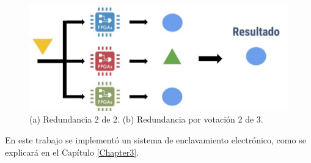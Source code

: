 			\begin{figure}[h]
				\centering
				\includegraphics[scale=.5]{./Figures/Redundancia}
				\caption{(a) Redundancia 2 de 2. (b) Redundancia por votación 2 de 3.}
				\label{fig:Redundancia}
			\end{figure}
			
			En este trabajo se implementó un sistema de enclavamiento electrónico, como se explicará en el Capítulo \ref{Chapter3}.
	 
	 		
